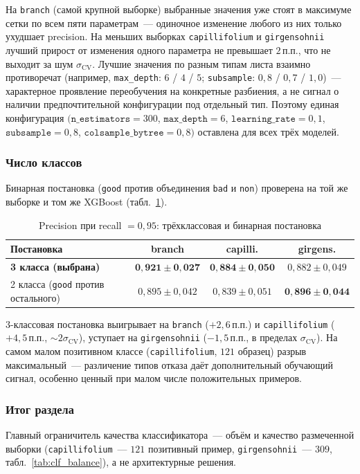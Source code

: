 На \texttt{branch} (самой крупной выборке) выбранные значения уже стоят
в максимуме сетки по всем пяти параметрам~--- одиночное изменение любого
из них только ухудшает precision. На меньших выборках
\texttt{capillifolium} и \texttt{girgensohnii} лучший прирост от
изменения одного параметра не превышает $2$\,п.п., что не выходит за
шум $\sigma_{\text{CV}}$. Лучшие значения по разным типам листа взаимно
противоречат (например, \texttt{max\_depth}: $6$ / $4$ / $5$;
\texttt{subsample}: $0{,}8$ / $0{,}7$ / $1{,}0$)~--- характерное
проявление переобучения на конкретные разбиения, а не сигнал о наличии
предпочтительной конфигурации под отдельный тип. Поэтому единая
конфигурация $(\texttt{n\_estimators} = 300$, $\texttt{max\_depth} = 6$,
$\texttt{learning\_rate} = 0{,}1$, $\texttt{subsample} = 0{,}8$,
$\texttt{colsample\_bytree} = 0{,}8)$ оставлена для всех трёх моделей.

\subsubsection*{Число классов}

Бинарная постановка (\texttt{good} против объединения \texttt{bad} и
\texttt{non}) проверена на той же выборке и том же XGBoost
(табл.~\ref{tab:clf_classes}).

\begin{table}[H]
\centering
\caption{Precision при recall $= 0{,}95$: трёхклассовая и бинарная постановка}
\label{tab:clf_classes}
\small
\begin{tabular}{lccc}
\hline
\textbf{Постановка} & \textbf{branch} & \textbf{capilli.} & \textbf{girgens.} \\
\hline
\textbf{3 класса (выбрана)} & $\mathbf{0{,}921 \pm 0{,}027}$ & $\mathbf{0{,}884 \pm 0{,}050}$ & $0{,}882 \pm 0{,}049$ \\
2 класса (\texttt{good} против остального) & $0{,}895 \pm 0{,}042$ & $0{,}839 \pm 0{,}051$ & $\mathbf{0{,}896 \pm 0{,}044}$ \\
\hline
\end{tabular}
\end{table}

3-классовая постановка выигрывает на \texttt{branch} ($+2{,}6$\,п.п.) и
\texttt{capillifolium} ($+4{,}5$\,п.п., $\sim 2\sigma_{\text{CV}}$), уступает
на \texttt{girgensohnii} ($-1{,}5$\,п.п., в пределах $\sigma_{\text{CV}}$).
На самом малом позитивном классе (\texttt{capillifolium}, $121$ образец)
разрыв максимальный~--- различение типов отказа даёт дополнительный
обучающий сигнал, особенно ценный при малом числе положительных примеров.

\subsubsection*{Итог раздела}

Главный ограничитель качества классификатора~--- объём и качество
размеченной выборки (\texttt{capillifolium}~--- $121$ позитивный пример,
\texttt{girgensohnii}~--- $309$, табл.~\ref{tab:clf_balance}), а не
архитектурные решения.
